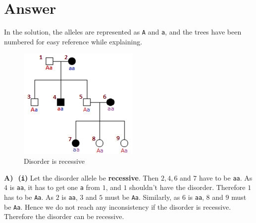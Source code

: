 \documentclass[12pt]{article}
\begin{document}
\section*{Answer}
\noindent In the solution, the alleles are represented as \texttt{A} and \texttt{a}, and the trees have been numbered for easy reference while explaining.\\
\begin{figure}
\vspace{-6mm}
    \centering
    \includegraphics[width=.8\linewidth]{Figures/Picture1_recessive.png}
    \caption{Disorder is recessive}
\end{figure}
\noindent\textbf{A)  \,\,(\texttt{i})} Let the disorder allele be \textbf{recessive}. Then $2,4,6$ and $7$ have to be \texttt{aa}. As $4$ is \texttt{aa}, it has to get one \texttt{a} from $1$, and $1$ shouldn't have the disorder. Therefore $1$ has to be \texttt{Aa}. As $2$ is \texttt{aa}, $3$ and $5$ must be \texttt{Aa}. Similarly, as $6$ is \texttt{aa}, $8$ and $9$ must be \texttt{Aa}. Hence we do not reach any inconsistency if the disorder is recessive.
Therefore the disorder can be recessive.
\\\\\\\\\\\\\
\end{document}
